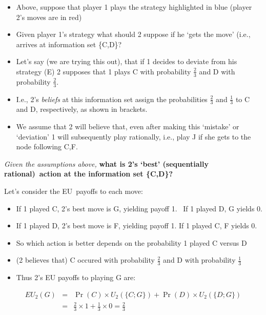 \documentclass{article}
\begin{document}
\begin{itemize}
\item Above, suppose that player 1 plays the strategy highlighted in blue
(player 2's moves are in red)

\item Given player 1's strategy what should 2 suppose if he `gets the move'
(i.e., arrives at information set \{C,D\}?

\item Let's say (we are trying this out), that if 1 decides to deviate from
his strategy (E) 2 supposes that 1 plays C with probability $\frac{2}{3}$
and D with probability $\frac{2}{3}$.

\item I.e., 2's \textit{beliefs} at this information set assign the
probabilities $\frac{2}{3}$ and $\frac{1}{3}$ to C and D, respectively, as
shown in brackets.

\item We assume that 2 will believe that, even after making this `mistake'
or `deviation' 1 will subsequently play rationally, i.e., play J if she gets
to the node following C,F.
\end{itemize}

\bigskip

\textit{Given the assumptions above, }\textbf{what is 2's `best'
(sequentially rational)\ action at the information set \{C,D\}?}

Let's consider the EU\ payoffs to each move:

\begin{itemize}
\item If 1 played C, 2's best move is G, yielding payoff 1. \ If 1 played D,
G yields 0.

\item If 1 played D, 2's best move is F, yielding payoff 1. If 1 played C, F
yields 0.

\item So which action is better depends on the probability 1 played C versus
D

\item (2 believes that) C occured with probability $\frac{2}{3}$ and D with
probability $\frac{1}{3}$

\item Thus 2's EU payoffs to playing G are:
\end{itemize}

\begin{eqnarray*}
EU_{2}(G) &=&\Pr (C)\times U_{2}(\{C;G\})+\Pr (D)\times U_{2}(\{D;G\}) \\
&=&\frac{2}{3}\times 1+\frac{1}{3}\times 0=\frac{2}{3}
\end{eqnarray*}
\end{document}
